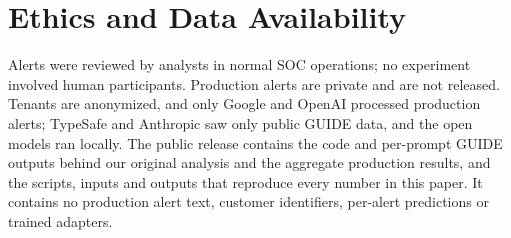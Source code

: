 \documentclass[letterpaper]{article} %
\begin{document}
\section{Ethics and Data Availability}

Alerts were reviewed by analysts in normal SOC operations; no experiment involved human participants. Production alerts are private and are not released. Tenants are anonymized, and only Google and OpenAI processed production alerts; TypeSafe and Anthropic saw only public GUIDE data, and the open models ran locally. The public release contains the code and per-prompt GUIDE outputs behind our original analysis and the aggregate production results, and the scripts, inputs and outputs that reproduce every number in this paper. It contains no production alert text, customer identifiers, per-alert predictions or trained adapters.


\end{document}
